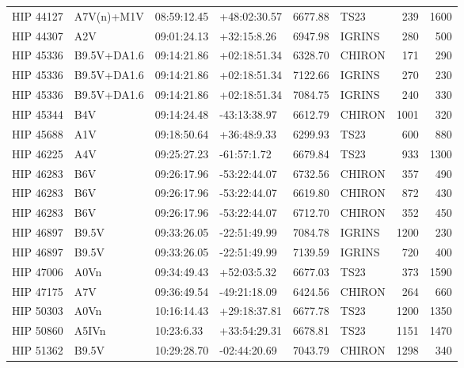 \documentclass{emulateapj}
\begin{document}
\begin{longtable*}{|l|lllrlrr|}
   HIP 44127 &     A7V(n)+M1V &    08:59:12.45 &   +48:02:30.57 &  6677.88 &       TS23 &      239 &    1600 \\
   HIP 44307 &            A2V &    09:01:24.13 &    +32:15:8.26 &  6947.98 &     IGRINS &      280 &     500 \\
   HIP 45336 &    B9.5V+DA1.6 &    09:14:21.86 &   +02:18:51.34 &  6328.70 &     CHIRON &      171 &     290 \\
   HIP 45336 &    B9.5V+DA1.6 &    09:14:21.86 &   +02:18:51.34 &  7122.66 &     IGRINS &      270 &     230 \\
   HIP 45336 &    B9.5V+DA1.6 &    09:14:21.86 &   +02:18:51.34 &  7084.75 &     IGRINS &      240 &     330 \\
   HIP 45344 &            B4V &    09:14:24.48 &   -43:13:38.97 &  6612.79 &     CHIRON &     1001 &     320 \\
   HIP 45688 &            A1V &    09:18:50.64 &    +36:48:9.33 &  6299.93 &       TS23 &      600 &     880 \\
   HIP 46225 &            A4V &    09:25:27.23 &    -61:57:1.72 &  6679.84 &       TS23 &      933 &    1300 \\
   HIP 46283 &            B6V &    09:26:17.96 &   -53:22:44.07 &  6732.56 &     CHIRON &      357 &     490 \\
   HIP 46283 &            B6V &    09:26:17.96 &   -53:22:44.07 &  6619.80 &     CHIRON &      872 &     430 \\
   HIP 46283 &            B6V &    09:26:17.96 &   -53:22:44.07 &  6712.70 &     CHIRON &      352 &     450 \\
   HIP 46897 &          B9.5V &    09:33:26.05 &   -22:51:49.99 &  7084.78 &     IGRINS &     1200 &     230 \\
   HIP 46897 &          B9.5V &    09:33:26.05 &   -22:51:49.99 &  7139.59 &     IGRINS &      720 &     400 \\
   HIP 47006 &           A0Vn &    09:34:49.43 &    +52:03:5.32 &  6677.03 &       TS23 &      373 &    1590 \\
   HIP 47175 &            A7V &    09:36:49.54 &   -49:21:18.09 &  6424.56 &     CHIRON &      264 &     660 \\
   HIP 50303 &           A0Vn &    10:16:14.43 &   +29:18:37.81 &  6677.78 &       TS23 &     1200 &    1350 \\
   HIP 50860 &          A5IVn &     10:23:6.33 &   +33:54:29.31 &  6678.81 &       TS23 &     1151 &    1470 \\
   HIP 51362 &          B9.5V &    10:29:28.70 &   -02:44:20.69 &  7043.79 &     CHIRON &     1298 &     340 \\

\end{longtable*}
\end{document}
